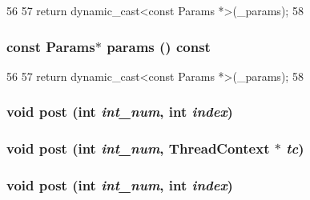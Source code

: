 \begin{DoxyCode}
56     {
57         return dynamic_cast<const Params *>(_params);
58     }
\end{DoxyCode}
\hypertarget{classMipsISA_1_1Interrupts_acd3c3feb78ae7a8f88fe0f110a718dff}{
\subsubsection[{params}]{\setlength{\rightskip}{0pt plus 5cm}const {\bf Params}$\ast$ params () const}}
\label{classMipsISA_1_1Interrupts_acd3c3feb78ae7a8f88fe0f110a718dff}



\begin{DoxyCode}
56     {
57         return dynamic_cast<const Params *>(_params);
58     }
\end{DoxyCode}
\hypertarget{classMipsISA_1_1Interrupts_a24c6c4fbdc0605bcd015ce06f194e4b4}{
\subsubsection[{post}]{\setlength{\rightskip}{0pt plus 5cm}void post (int {\em int\_\-num}, \/  int {\em index})}}
\label{classMipsISA_1_1Interrupts_a24c6c4fbdc0605bcd015ce06f194e4b4}
\hypertarget{classMipsISA_1_1Interrupts_a03cb6c87689ac9000f54a7eacfa2c730}{
\subsubsection[{post}]{\setlength{\rightskip}{0pt plus 5cm}void post (int {\em int\_\-num}, \/  {\bf ThreadContext} $\ast$ {\em tc})}}
\label{classMipsISA_1_1Interrupts_a03cb6c87689ac9000f54a7eacfa2c730}
\hypertarget{classMipsISA_1_1Interrupts_a24c6c4fbdc0605bcd015ce06f194e4b4}{
\subsubsection[{post}]{\setlength{\rightskip}{0pt plus 5cm}void post (int {\em int\_\-num}, \/  int {\em index})}}
\label{classMipsISA_1_1Interrupts_a24c6c4fbdc0605bcd015ce06f194e4b4}



